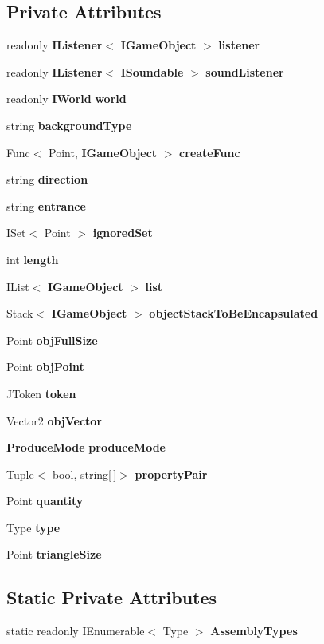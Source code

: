 \subsection*{Private Attributes}
\begin{DoxyCompactItemize}
\item 
readonly \textbf{ I\+Listener}$<$ \textbf{ I\+Game\+Object} $>$ \textbf{ listener}
\item 
readonly \textbf{ I\+Listener}$<$ \textbf{ I\+Soundable} $>$ \textbf{ sound\+Listener}
\item 
readonly \textbf{ I\+World} \textbf{ world}
\item 
string \textbf{ background\+Type}
\item 
Func$<$ Point, \textbf{ I\+Game\+Object} $>$ \textbf{ create\+Func}
\item 
string \textbf{ direction}
\item 
string \textbf{ entrance}
\item 
I\+Set$<$ Point $>$ \textbf{ ignored\+Set}
\item 
int \textbf{ length}
\item 
I\+List$<$ \textbf{ I\+Game\+Object} $>$ \textbf{ list}
\item 
Stack$<$ \textbf{ I\+Game\+Object} $>$ \textbf{ object\+Stack\+To\+Be\+Encapsulated}
\item 
Point \textbf{ obj\+Full\+Size}
\item 
Point \textbf{ obj\+Point}
\item 
J\+Token \textbf{ token}
\item 
Vector2 \textbf{ obj\+Vector}
\item 
\textbf{ Produce\+Mode} \textbf{ produce\+Mode}
\item 
Tuple$<$ bool, string[$\,$]$>$ \textbf{ property\+Pair}
\item 
Point \textbf{ quantity}
\item 
Type \textbf{ type}
\item 
Point \textbf{ triangle\+Size}
\end{DoxyCompactItemize}
\subsection*{Static Private Attributes}
\begin{DoxyCompactItemize}
\item 
static readonly I\+Enumerable$<$ Type $>$ \textbf{ Assembly\+Types}
\end{DoxyCompactItemize}


